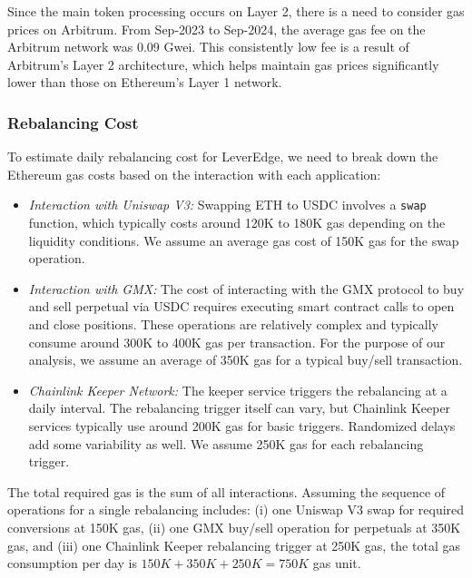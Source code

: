 Since the main token processing occurs on Layer 2, there is a need to consider gas prices on Arbitrum. From Sep-2023 to Sep-2024, the average gas fee on the Arbitrum network was 0.09 Gwei. This consistently low fee is a result of Arbitrum's Layer 2 architecture, which helps maintain gas prices significantly lower than those on Ethereum's Layer 1 network.
\subsubsection{Rebalancing Cost}
To estimate daily rebalancing cost for LeverEdge, we need to break down the Ethereum gas costs based on the interaction with each application:
\begin{itemize}[leftmargin=*] 
	\item \textit{Interaction with Uniswap V3:} Swapping ETH to USDC involves a \texttt{swap} function, which typically costs around 120K to 180K gas depending on the liquidity conditions. We assume an average gas cost of 150K gas for the swap operation.
	
	\item \textit{Interaction with GMX:} The cost of interacting with the GMX protocol to buy and sell perpetual via USDC requires executing smart contract calls to open and close positions. These operations are relatively complex and typically consume around 300K to 400K gas per transaction. For the purpose of our analysis, we assume an average of 350K gas for a typical buy/sell transaction.
	
	\item \textit{Chainlink Keeper Network:} The keeper service triggers the rebalancing at a daily interval. The rebalancing trigger itself can vary, but Chainlink Keeper services typically use around 200K gas for basic triggers. Randomized delays add some variability as well. We assume 250K gas for each rebalancing trigger.
\end{itemize}
The total required gas is the sum of all interactions. Assuming the sequence of operations for a single rebalancing includes: (i) one Uniswap V3 swap for required conversions at 150K gas, (ii) one GMX buy/sell operation for perpetuals at 350K gas, and (iii) one Chainlink Keeper rebalancing trigger at 250K gas, the total gas consumption per day is \(150K + 350K + 250K = 750K\) gas unit. 


